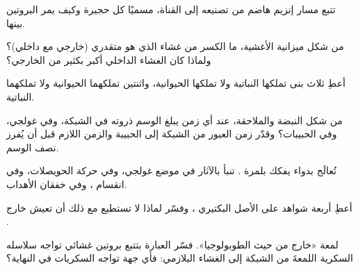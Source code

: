 \begin{exercise}[$\star$]\label{exo:b1:eukaryotic-cell:2}
تتبع مسار إنزيم هاضم من تصنيعه إلى القناة، مسميًا كل حجيرة وكيف يمر
البروتين بينها.
\end{exercise}

\begin{exercise}[$\star$]\label{exo:b1:eukaryotic-cell:3}
من شكل ميزانية الأغشية، ما الكسر من غشاء  الذي هو متقدري
(خارجي مع داخلي)؟ ولماذا كان الغشاء الداخلي أكبر بكثير من الخارجي؟
\end{exercise}

\begin{exercise}[$\star$]\label{exo:b1:eukaryotic-cell:4}
أعطِ ثلاث بنى تملكها  النباتية ولا تملكها الحيوانية، واثنتين
تملكهما الحيوانية ولا تملكهما النباتية.
\end{exercise}

\begin{exercise}[$\star\star$]\label{exo:b1:eukaryotic-cell:5}
من شكل النبضة والملاحقة، عند أي زمن يبلغ الوسم ذروته في الشبكة، وفي
غولجي، وفي الحبيبات؟ وقدّر زمن العبور من الشبكة إلى الحبيبة والزمن
اللازم قبل أن يُفرز نصف الوسم.
\end{exercise}

\begin{exercise}[$\star\star$]\label{exo:b1:eukaryotic-cell:6}
تُعالَج  بدواء يفكك بلمرة . تنبأ بالآثار في
موضع غولجي، وفي حركة الحويصلات، وفي انقسام ، وفي خفقان
الأهداب.
\end{exercise}

\begin{exercise}[$\star\star$]\label{exo:b1:eukaryotic-cell:7}
أعطِ أربعة شواهد على الأصل البكتيري ، وفسّر لماذا لا تستطيع
 مع ذلك أن تعيش خارج .
\end{exercise}

\begin{exercise}[$\star\star$]\label{exo:b1:eukaryotic-cell:8}
لمعة  «خارج  من حيث الطوبولوجيا». فسّر
العبارة بتتبع بروتين غشائي تواجه سلاسله السكرية اللمعةَ من الشبكة
إلى الغشاء البلازمي: فأي جهة تواجه السكريات في النهاية؟
\end{exercise}

